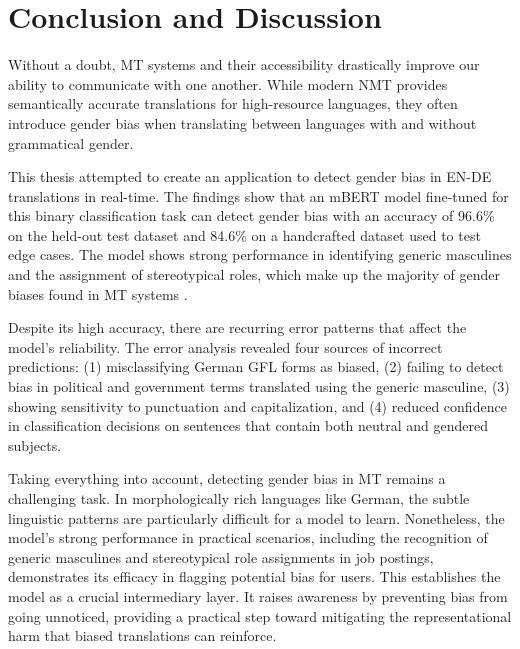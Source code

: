 \chapter{Conclusion and Discussion}
   Without a doubt, MT systems and their accessibility drastically improve our ability to communicate with one another. While modern NMT provides semantically accurate translations for high-resource languages, they often introduce gender bias when translating between languages with and without grammatical gender.

   This thesis attempted to create an application to detect gender bias in EN-DE translations in real-time. The findings show that an mBERT model fine-tuned for this binary classification task can detect gender bias with an accuracy of 96.6\% on the held-out test dataset and 84.6\% on a handcrafted dataset used to test edge cases. The model shows strong performance in identifying generic masculines and the assignment of stereotypical roles, which make up the majority of gender biases found in MT systems \parencite{lardelliBuildingBridgesDataset2024,stanovskyEvaluatingGenderBias2019,pratesAssessingGenderBias2019}.

   Despite its high accuracy, there are recurring error patterns that affect the model’s reliability. The error analysis revealed four sources of incorrect predictions: (1) misclassifying German GFL forms as biased, (2) failing to detect bias in political and government terms translated using the generic masculine, (3) showing sensitivity to punctuation and capitalization, and (4) reduced confidence in classification decisions on sentences that contain both neutral and gendered subjects.

   Taking everything into account, detecting gender bias in MT remains a challenging task. In morphologically rich languages like German, the subtle linguistic patterns are particularly difficult for a model to learn. Nonetheless, the model's strong performance in practical scenarios, including the recognition of generic masculines and stereotypical role assignments in job postings, demonstrates its efficacy in flagging potential bias for users. This establishes the model as a crucial intermediary layer. It raises awareness by preventing bias from going unnoticed, providing a practical step toward mitigating the representational harm that biased translations can reinforce.

